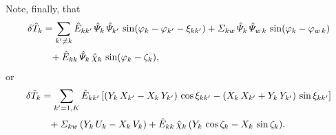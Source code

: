 \documentclass[notitlepage,12pt]{article}
\begin{document}
Note, finally, that
\begin{align}
\delta \hat{T}_k &= \sum_{k'\neq k} \hat{E}_{kk'}\,\hat{\mit\Psi}_k\,\hat{\mit\Psi}_{k'}\,\sin(\varphi_k-\varphi_{k'}-\xi_{kk'}) 
+{\mit\Sigma}_{kw}\,\hat{\mit\Psi}_k\,\hat{\mit\Psi}_{w\,k}\,\sin(\varphi_k-\varphi_{w\,k})\nonumber\\[0.5ex]
&\phantom{=}
+ \hat{E}_{kk}\,\hat{\mit\Psi}_k\,\hat{\chi}_k\,\sin(\varphi_k-\zeta_k),
\end{align}
or
\begin{align}
\delta \hat{T}_k&= \sum_{k'=1,K}\hat{E}_{kk'}\left[(Y_k\,X_{k'}-X_k\,Y_{k'})\,\cos\xi_{kk'}- (X_k\,X_{k'}+Y_k\,Y_{k'})\,\sin\xi_{kk'}\right]\nonumber\\[0.5ex]
&\phantom{=}+{\mit\Sigma}_{kw}\,(Y_k\,U_k-X_k\,V_k)+\hat{E}_{kk}\,\hat{\chi}_k\,(Y_k\,\cos\zeta_k-X_k\,\sin\zeta_k).
\end{align}
\end{document}
